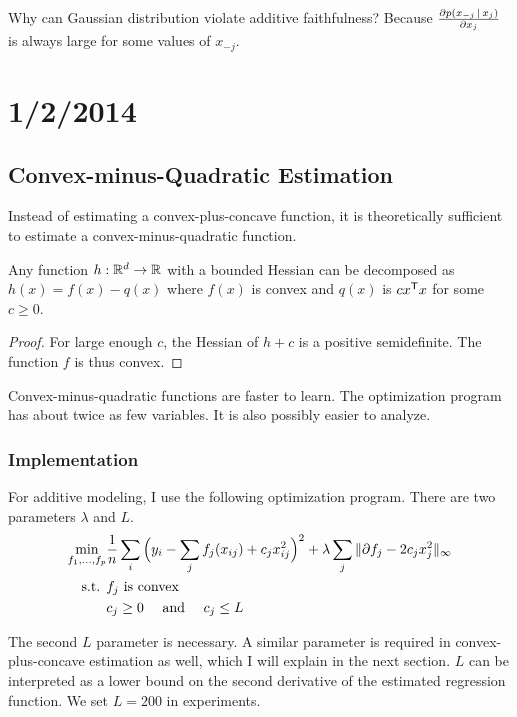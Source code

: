 \documentclass{article}
\begin{document}
Why can Gaussian distribution violate additive faithfulness? Because $\frac{\partial p( x_{-j} \,|\, x_j) }{\partial x_j}$ is always large for some values of $x_{-j}$.

\newpage

\section{1/2/2014}

\subsection{Convex-minus-Quadratic Estimation}

Instead of estimating a convex-plus-concave function, it is theoretically sufficient to estimate a convex-minus-quadratic function. 

\begin{theorem}
Any function $h : \mathbb{R}^d \rightarrow \mathbb{R}$ with a bounded Hessian can be decomposed as $h(x) = f(x) - q(x)$ where $f(x)$ is convex and $q(x)$ is $c x^{\mathsf{T}} x$ for some $c \geq 0$. 
\end{theorem}

\begin{proof}
For large enough $c$, the Hessian of $h + c$ is a positive semidefinite. The function $f$ is thus convex.
\end{proof}

Convex-minus-quadratic functions are faster to learn. The optimization program has about twice as few variables. It is also possibly easier to analyze. \\

\subsubsection{Implementation}

For additive modeling, I use the following optimization program. There are two parameters $\lambda$ and $L$. 
\begin{align*}
\min_{f_1, ..., f_p} & \frac{1}{n} \sum_i 
  \Big(y_i - \sum_j f_j(x_{ij}) + c_j x_{ij}^2 \Big)^2 + 
  \lambda \sum_j \| \partial f_j - 2 c_j x_j^2 \|_\infty \\
\textrm{s.t. } & f_j \textrm{ is convex} \\
  & c_j \geq 0 \quad \textrm{ and } \quad c_j \leq L
\end{align*}

The second $L$ parameter is necessary. A similar parameter is required in convex-plus-concave estimation as well, which I will explain in the next section. $L$ can be interpreted as a lower bound on the second derivative of the estimated regression function. We set $L=200$ in experiments.
\end{document}
